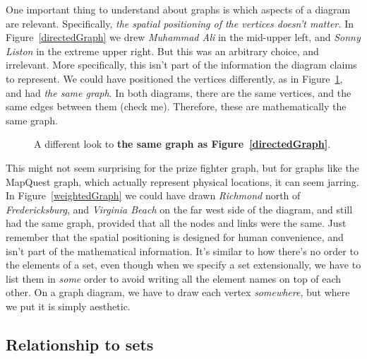 One important thing to understand about graphs is which aspects of a
diagram are relevant. Specifically, \textit{the spatial positioning of the
vertices doesn't matter.} In Figure~\ref{directedGraph} we drew
\textsl{Muhammad Ali} in the mid-upper left, and \textsl{Sonny Liston}  in
the extreme upper right. But this was an arbitrary choice, and irrelevant.
More specifically, this isn't part of the information the diagram claims to
represent. We could have positioned the vertices differently, as in
Figure~\ref{directedGraphDiff}, and had \textit{the same graph}. In both
diagrams, there are the same vertices, and the same edges between them
(check me). Therefore, these are mathematically the same graph.

\begin{figure}[ht]
\centering
{}
\caption{A different look to \textbf{the same graph as
Figure~\ref{directedGraph}}.}
\label{directedGraphDiff}
\end{figure}

This might not seem surprising for the prize fighter graph, but for graphs
like the MapQuest graph, which actually represent physical locations, it
can seem jarring. In Figure~\ref{weightedGraph} we could have drawn
\textsl{Richmond} north of \textsl{Fredericksburg}, and \textsl{Virginia
Beach} on the far west side of the diagram, and still had the same graph,
provided that all the nodes and links were the same. Just remember that the
spatial positioning is designed for human convenience, and isn't part of
the mathematical information. It's similar to how there's no order to the
elements of a set, even though when we specify a set extensionally, we have
to list them in \textit{some} order to avoid writing all the element names
on top of each other. On a graph diagram, we have to draw each vertex
\textit{somewhere}, but where we put it is simply aesthetic.


\subsection{Relationship to sets}


